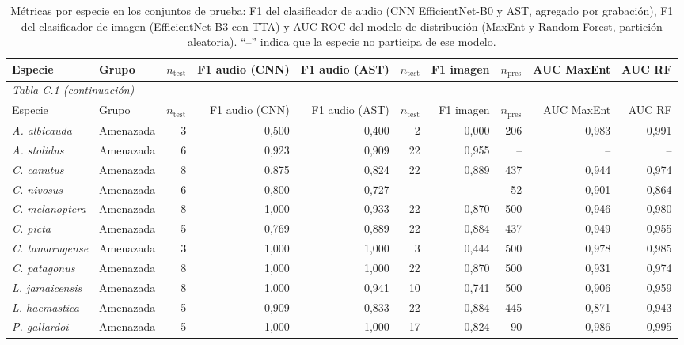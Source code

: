 \setlength{\tabcolsep}{2.5pt}
{\scriptsize
\begin{longtable}{@{}l l r r r r r r r r@{}}
  \caption{Métricas por especie en los conjuntos de prueba: F1 del clasificador de audio (CNN EfficientNet-B0 y AST, agregado por grabación), F1 del clasificador de imagen (EfficientNet-B3 con TTA) y AUC-ROC del modelo de distribución (MaxEnt y Random Forest, partición aleatoria). ``--'' indica que la especie no participa de ese modelo.}
  \label{tab:anexoC}\\
  \toprule
  Especie & Grupo & $n_\mathrm{test}$ & F1 audio (CNN) & F1 audio (AST) & $n_\mathrm{test}$ & F1 imagen & $n_\mathrm{pres}$ & AUC MaxEnt & AUC RF \\
  \midrule
  \endfirsthead
  \multicolumn{10}{l}{\footnotesize\textit{Tabla C.1 (continuación)}}\\
  \toprule
  Especie & Grupo & $n_\mathrm{test}$ & F1 audio (CNN) & F1 audio (AST) & $n_\mathrm{test}$ & F1 imagen & $n_\mathrm{pres}$ & AUC MaxEnt & AUC RF \\
  \midrule
  \endhead
  \bottomrule
  \endlastfoot
    \textit{A. albicauda} & Amenazada & 3 & 0,500 & 0,400 & 2 & 0,000 & 206 & 0,983 & 0,991 \\
    \textit{A. stolidus} & Amenazada & 6 & 0,923 & 0,909 & 22 & 0,955 & -- & -- & -- \\
    \textit{C. canutus} & Amenazada & 8 & 0,875 & 0,824 & 22 & 0,889 & 437 & 0,944 & 0,974 \\
    \textit{C. nivosus} & Amenazada & 6 & 0,800 & 0,727 & -- & -- & 52 & 0,901 & 0,864 \\
    \textit{C. melanoptera} & Amenazada & 8 & 1,000 & 0,933 & 22 & 0,870 & 500 & 0,946 & 0,980 \\
    \textit{C. picta} & Amenazada & 5 & 0,769 & 0,889 & 22 & 0,884 & 437 & 0,949 & 0,955 \\
    \textit{C. tamarugense} & Amenazada & 3 & 1,000 & 1,000 & 3 & 0,444 & 500 & 0,978 & 0,985 \\
    \textit{C. patagonus} & Amenazada & 8 & 1,000 & 1,000 & 22 & 0,870 & 500 & 0,931 & 0,974 \\
    \textit{L. jamaicensis} & Amenazada & 8 & 1,000 & 0,941 & 10 & 0,741 & 500 & 0,906 & 0,959 \\
    \textit{L. haemastica} & Amenazada & 5 & 0,909 & 0,833 & 22 & 0,884 & 445 & 0,871 & 0,943 \\
    \textit{P. gallardoi} & Amenazada & 5 & 1,000 & 1,000 & 17 & 0,824 & 90 & 0,986 & 0,995 \\

\end{longtable}}
